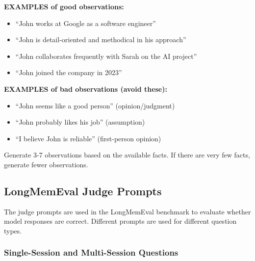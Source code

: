 \begin{tcolorbox}
\textbf{EXAMPLES of good observations:}
\begin{itemize}
    \item ``John works at Google as a software engineer''
    \item ``John is detail-oriented and methodical in his approach''
    \item ``John collaborates frequently with Sarah on the AI project''
    \item ``John joined the company in 2023''
\end{itemize}

\textbf{EXAMPLES of bad observations (avoid these):}
\begin{itemize}
    \item ``John seems like a good person'' (opinion/judgment)
    \item ``John probably likes his job'' (assumption)
    \item ``I believe John is reliable'' (first-person opinion)
\end{itemize}

\vspace{0.2cm}

Generate 3-7 observations based on the available facts. If there are very few facts, generate fewer observations.
\end{tcolorbox}

\subsection{LongMemEval Judge Prompts}
\label{sec:appendix-judge-prompts}

The judge prompts are used in the LongMemEval benchmark to evaluate whether model responses are correct. Different prompts are used for different question types.

\subsubsection{Single-Session and Multi-Session Questions}

